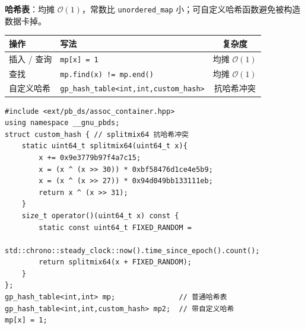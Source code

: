 \textbf{哈希表}：均摊 $\mathcal{O}(1)$，常数比 \texttt{unordered\_map} 小；可自定义哈希函数避免被构造数据卡掉。

\begin{center}
\small
\begin{tabular}{lp{7cm}c}
\toprule
操作 & 写法 & 复杂度 \\
\midrule
插入 / 查询 & \texttt{mp[x] = 1} & 均摊 $\mathcal{O}(1)$ \\
查找 & \texttt{mp.find(x) != mp.end()} & 均摊 $\mathcal{O}(1)$ \\
自定义哈希 & \texttt{gp\_hash\_table<int,int,\allowbreak custom\_hash>} & 抗哈希冲突 \\
\bottomrule
\end{tabular}
\end{center}

\begin{lstlisting}
#include <ext/pb_ds/assoc_container.hpp>
using namespace __gnu_pbds;
struct custom_hash { // splitmix64 抗哈希冲突
    static uint64_t splitmix64(uint64_t x){
        x += 0x9e3779b97f4a7c15;
        x = (x ^ (x >> 30)) * 0xbf58476d1ce4e5b9;
        x = (x ^ (x >> 27)) * 0x94d049bb133111eb;
        return x ^ (x >> 31);
    }
    size_t operator()(uint64_t x) const {
        static const uint64_t FIXED_RANDOM =
            std::chrono::steady_clock::now().time_since_epoch().count();
        return splitmix64(x + FIXED_RANDOM);
    }
};
gp_hash_table<int,int> mp;               // 普通哈希表
gp_hash_table<int,int,custom_hash> mp2;  // 带自定义哈希
mp[x] = 1;
\end{lstlisting}
